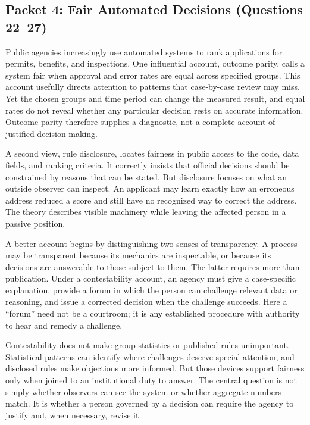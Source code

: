 \subsection*{Packet 4: Fair Automated Decisions (Questions 22--27)}

Public agencies increasingly use automated systems to rank applications for permits,
benefits, and inspections. One influential account, outcome parity, calls a system fair when
approval and error rates are equal across specified groups. This account usefully directs
attention to patterns that case-by-case review may miss. Yet the chosen groups and time
period can change the measured result, and equal rates do not reveal whether any particular
decision rests on accurate information. Outcome parity therefore supplies a diagnostic,
not a complete account of justified decision making.

A second view, rule disclosure, locates fairness in public access to the code, data fields,
and ranking criteria. It correctly insists that official decisions should be constrained by
reasons that can be stated. But disclosure focuses on what an outside observer can inspect.
An applicant may learn exactly how an erroneous address reduced a score and still have no
recognized way to correct the address. The theory describes visible machinery while leaving
the affected person in a passive position.

A better account begins by distinguishing two senses of transparency. A process may be
transparent because its mechanics are inspectable, or because its decisions are answerable
to those subject to them. The latter requires more than publication. Under a contestability
account, an agency must give a case-specific explanation, provide a forum in which the person
can challenge relevant data or reasoning, and issue a corrected decision when the challenge
succeeds. Here a ``forum'' need not be a courtroom; it is any established procedure with
authority to hear and remedy a challenge.

Contestability does not make group statistics or published rules unimportant. Statistical
patterns can identify where challenges deserve special attention, and disclosed rules make
objections more informed. But those devices support fairness only when joined to an
institutional duty to answer. The central question is not simply whether observers can see
the system or whether aggregate numbers match. It is whether a person governed by a decision
can require the agency to justify and, when necessary, revise it.

